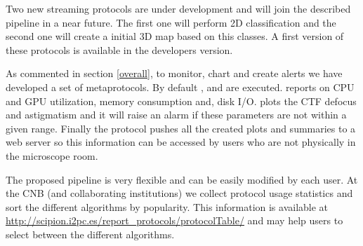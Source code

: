Two new streaming protocols are under development and will join the described  pipeline in a near future. The first one will perform 2D classification and the second one will create a initial 3D map based on this classes. A first version of these protocols is available in the \scipion developers version.

As commented in section \ref{overall}, to monitor, chart and create alerts  we have developed a set of metaprotocols. By default ,  and  are executed.  reports on  CPU and GPU utilization, memory consumption and, disk I/O.  plots the CTF defocus and astigmatism  and it will raise an alarm if these parameters are not within a given range. Finally the  protocol pushes all the created plots and summaries to a web server so this information can be accessed by users who are not physically in the microscope room.

The proposed pipeline is very flexible and can be easily modified by each user. At the CNB (and collaborating institutions) we collect protocol usage statistics and sort the different algorithms by popularity.  This information is available at  \url{http://scipion.i2pc.es/report_protocols/protocolTable/} and may help users to select between the different algorithms.


